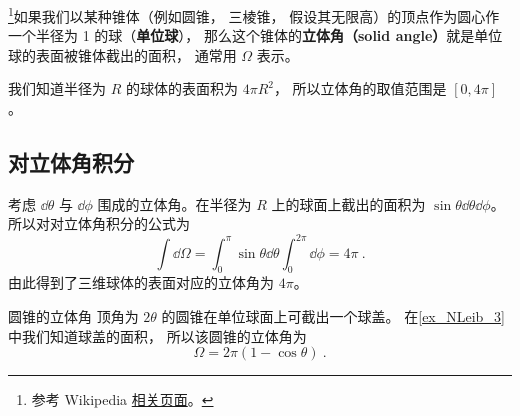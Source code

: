 
\begin{issues}
\issueTODO
\end{issues}


\footnote{参考 Wikipedia \href{https://en.wikipedia.org/wiki/Solid_angle}{相关页面}。}如果我们以某种锥体（例如圆锥， 三棱锥， 假设其无限高）的顶点作为圆心作一个半径为 1 的球（\textbf{单位球}）， 那么这个锥体的\textbf{立体角（solid angle）}就是单位球的表面被锥体截出的面积， 通常用 $\Omega$ 表示。

我们知道半径为 $R$ 的球体的表面积为 $4\pi R^2$， 所以立体角的取值范围是 $[0, 4\pi]$。

\subsection{对立体角积分}
考虑 $\dd \theta$ 与 $\dd \phi$ 围成的立体角。在半径为 $R$ 上的球面上截出的面积为 $\sin\theta \dd \theta \dd \phi$。所以对对立体角积分的公式为
\begin{equation}
\int \dd \Omega=\int_0^\pi \sin\theta \dd \theta \int_0^{2\pi }\dd \phi =4\pi~.
\end{equation}
由此得到了三维球体的表面对应的立体角为 $4\pi$。


\begin{example}{圆锥的立体角}
顶角为 $2\theta$ 的圆锥在单位球面上可截出一个球盖。 在\autoref{ex_NLeib_3}  中我们知道球盖的面积， 所以该圆锥的立体角为
\begin{equation}
\Omega = 2\pi (1 - \cos\theta)~.
\end{equation}
\end{example}

